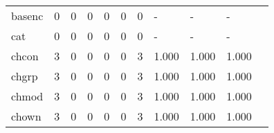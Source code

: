 \begin{longtable}{lp{1.2cm}p{1.2cm}p{1.2cm}p{1.2cm}p{1.2cm}p{1.2cm}p{1.2cm}p{1.2cm}p{1.2cm}p{1.2cm}}
basenc    &                                     0 &                                                  0 &                                                  0 &                                                  0 &                                                  0 &                                                  0 &                                                  - &                                                  - &                                                  - \\
cat       &                                     0 &                                                  0 &                                                  0 &                                                  0 &                                                  0 &                                                  0 &                                                  - &                                                  - &                                                  - \\
chcon     &                                     3 &                                                  0 &                                                  0 &                                                  0 &                                                  0 &                                                  3 &                                              1.000 &                                              1.000 &                                              1.000 \\
chgrp     &                                     3 &                                                  0 &                                                  0 &                                                  0 &                                                  0 &                                                  3 &                                              1.000 &                                              1.000 &                                              1.000 \\
chmod     &                                     3 &                                                  0 &                                                  0 &                                                  0 &                                                  0 &                                                  3 &                                              1.000 &                                              1.000 &                                              1.000 \\
chown     &                                     3 &                                                  0 &                                                  0 &                                                  0 &                                                  0 &                                                  3 &                                              1.000 &                                              1.000 &                                              1.000 \\

\end{longtable}
